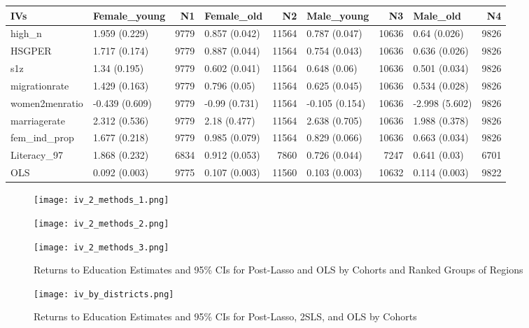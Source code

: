 \documentclass[a4paper,12pt,twoside]{book}
\begin{document}
\begin{table}[ht]
	\centering
	\begin{tabular}{llrlrlrlr}
		\hline
		IVs & Female\_young & N1 & Female\_old & N2 & Male\_young & N3 & Male\_old & N4 \\ 
		\hline
		high\_n & 1.959 (0.229) & 9779 & 0.857 (0.042) & 11564 & 0.787 (0.047) & 10636 & 0.64 (0.026) & 9826 \\ 
		HSGPER & 1.717 (0.174) & 9779 & 0.887 (0.044) & 11564 & 0.754 (0.043) & 10636 & 0.636 (0.026) & 9826 \\ 
		s1z & 1.34 (0.195) & 9779 & 0.602 (0.041) & 11564 & 0.648 (0.06) & 10636 & 0.501 (0.034) & 9826 \\ 
		migrationrate & 1.429 (0.163) & 9779 & 0.796 (0.05) & 11564 & 0.625 (0.045) & 10636 & 0.534 (0.028) & 9826 \\ 
		women2menratio & -0.439 (0.609) & 9779 & -0.99 (0.731) & 11564 & -0.105 (0.154) & 10636 & -2.998 (5.602) & 9826 \\ 
		marriagerate & 2.312 (0.536) & 9779 & 2.18 (0.477) & 11564 & 2.638 (0.705) & 10636 & 1.988 (0.378) & 9826 \\ 
		fem\_ind\_prop & 1.677 (0.218) & 9779 & 0.985 (0.079) & 11564 & 0.829 (0.066) & 10636 & 0.663 (0.034) & 9826 \\ 
		Literacy\_97 & 1.868 (0.232) & 6834 & 0.912 (0.053) & 7860 & 0.726 (0.044) & 7247 & 0.641 (0.03) & 6701 \\ 
		OLS & 0.092 (0.003) & 9775 & 0.107 (0.003) & 11560 & 0.103 (0.003) & 10632 & 0.114 (0.003) & 9822 \\ 
		\hline
	\end{tabular}
\end{table}


	
\begin{figure}[htbp!]
	\begin{minipage}[b]{\textwidth}
		\centering
		\texttt{[image: iv\_2\_methods\_1.png]}
		\label{fig:5.4a}
	\end{minipage}
	\hfill
	\begin{minipage}[b]{\textwidth}
		\centering
		\texttt{[image: iv\_2\_methods\_2.png]}
		\label{fig:5.4b}
	\end{minipage}
	\hfill
	\begin{minipage}[b]{\textwidth}
		\centering
		\texttt{[image: iv\_2\_methods\_3.png]}
		\label{fig:5.4c}
	\end{minipage}
	\caption{Returns to Education Estimates and 95\% CIs for Post-Lasso and OLS by Cohorts and Ranked Groups of Regions}
	\label{fig:5.4}
\end{figure}

\begin{figure}[H]
	\texttt{[image: iv\_by\_districts.png]}
	\caption{Returns to Education Estimates and 95\% CIs for Post-Lasso, 2SLS, and OLS by Cohorts} \label{fig:5.5}
\end{figure}
\end{document}
